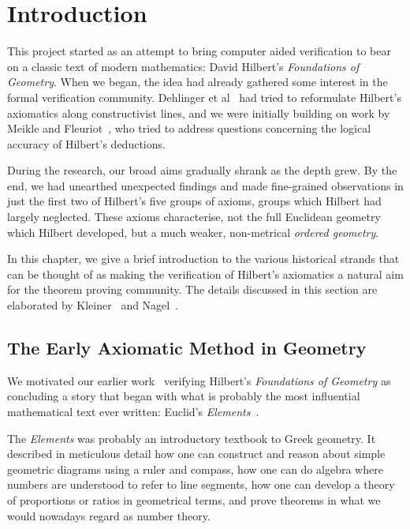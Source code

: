 \chapter{Introduction}\label{chapter:Introduction}
This project started as an attempt to bring computer aided verification to bear on a classic text of modern mathematics: David Hilbert's \emph{Foundations of Geometry}. When we began, the idea had already gathered some interest in the formal verification community. Dehlinger et al~\cite{DehlingerFOG} had tried to reformulate Hilbert's axiomatics along constructivist lines, and we were initially building on work by Meikle and Fleuriot~\cite{MeikleFleuriotFormalizingHilbert}, who tried to address questions concerning the logical accuracy of Hilbert's deductions. 

During the research, our broad aims gradually shrank as the depth grew. By the end, we had unearthed unexpected findings and made fine-grained observations in just the first two of Hilbert's five groups of axioms, groups which Hilbert had largely neglected. These axioms characterise, not the full Euclidean geometry which Hilbert developed, but a much weaker, non-metrical \emph{ordered geometry}.

In this chapter, we give a brief introduction to the various historical strands that can be thought of as making the verification of Hilbert's axiomatics a natural aim for the theorem proving community. The details discussed in this section are elaborated by Kleiner~\cite{RigourProof} and Nagel~\cite{NagelModernGeometry}.

\section{The Early Axiomatic Method in Geometry}
We motivated our earlier work~\cite{ScottMScThesis} verifying Hilbert's \emph{Foundations of Geometry} as concluding a story that began with what is probably the most influential~\cite{BoyerEuclidInfluence} mathematical text ever written: Euclid's \emph{Elements}~\cite{HeathElements}. 

The \emph{Elements} was probably an introductory textbook to Greek geometry. It described in meticulous detail how one can construct and reason about simple geometric diagrams using a ruler and compass, how one can do algebra where numbers are understood to refer to line segments, how one can develop a theory of proportions or ratios in geometrical terms, and prove theorems in what we would nowadays regard as number theory. 

